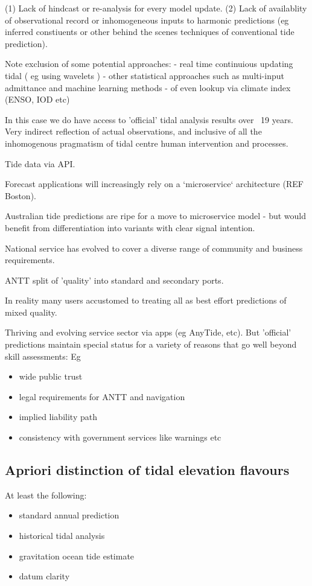 (1) Lack of hindcast or re-analysis for every model update.
(2) Lack of availablity of observational record or inhomogeneous inputs to harmonic predictions (eg inferred constiuents or other behind the scenes techniques of conventional tide prediction).

Note exclusion of some potential approaches:
- real time continuious updating tidal ( eg using wavelets )
- other statistical approaches such as multi-input admittance and machine learning methods 
- of even lookup via climate index (ENSO, IOD etc)

In this case we do have  access to 'official' tidal analysis results over ~19 years.  
Very indirect reflection of actual observations, and inclusive of all the inhomogenous pragmatism of tidal centre human intervention and processes.


Tide data via API.




Forecast applications will increasingly rely on a `microservice` architecture (REF Boston).

Australian tide predictions are ripe for a move to microservice model - but would benefit from differentiation into variants with clear signal intention.


National service has evolved to cover a diverse range of community and business requirements.

ANTT split of 'quality' into standard and secondary ports.

In reality many users accustomed to treating all as best effort predictions of mixed quality.

Thriving and evolving service sector via apps (eg AnyTide, etc).
But 'official' predictions maintain special status for a variety of reasons that go well beyond skill assessments:
Eg
\begin{itemize}
    \item wide public trust 
    \item legal requirements for ANTT and navigation
    \item implied liability path 
    \item consistency with government services like warnings etc
\end{itemize}


\subsection{Apriori distinction of tidal elevation flavours}
At least the following:
\begin{itemize}
    \item standard annual prediction
    \item historical tidal analysis
    \item gravitation ocean tide estimate
    \item datum clarity
\end{itemize}


